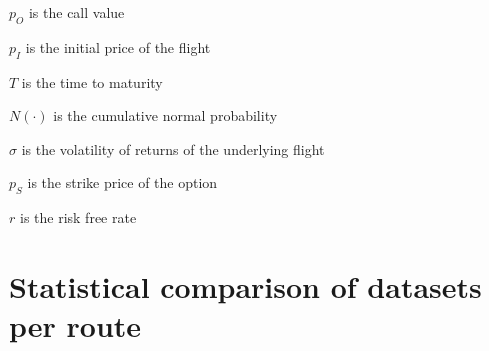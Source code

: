 \begin{compactdesc}
\item[$p_O$] is the call value
\item[$p_I$] is the initial price of the flight
\item[$T$] is the time to maturity
\item[$N(\cdot)$] is the cumulative normal probability
\item[$\sigma$] is the volatility of returns of the underlying flight
\item[$p_S$] is the strike price of the option
\item[$r$] is the risk free rate
\vspace{1ex}
\end{compactdesc}



\chapter{Statistical comparison of datasets per route}
\label{app:StatisticalComparisonDatasets}

